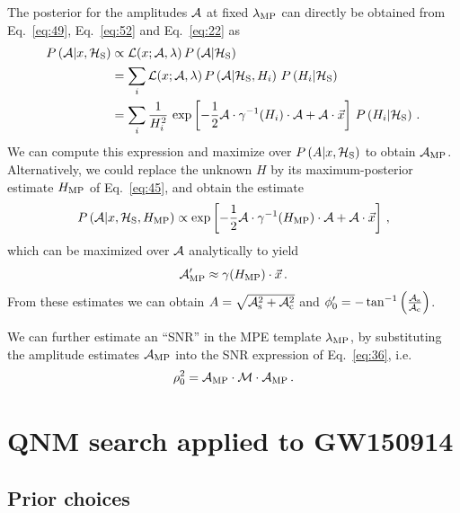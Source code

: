 \documentclass[aps,prd,onecolumn,notitlepage,nofootinbib,superscriptaddress,altaffilletter,floatfix]{revtex4-1}
\begin{document}
The posterior for the amplitudes ${\mathcal A}$ at fixed $\lambda_{\mathrm{MP}}$ can directly be obtained from Eq.~\eqref{eq:49}, Eq.~\eqref{eq:52} and Eq.~\eqref{eq:22} as
\begin{align}
  \label{eq:51}
  P\left({\mathcal A}\middle|x,\mathcal{H}_{\mathrm{S}}\right) &\propto \mathcal{L}(x;{\mathcal A},\lambda)\,P\left({\mathcal A}\middle|\mathcal{H}_{\mathrm{S}}\right) \\
  &= \sum_i \mathcal{L}(x;{\mathcal A},\lambda)\,P\left({\mathcal A}\middle|\mathcal{H}_{\mathrm{S}},H_i\right)\,P\left(H_i\middle|\mathcal{H}_{\mathrm{S}}\right)\,\\
  &= \sum_i \frac{1}{H_i^2}\,\exp\left[ -\frac{1}{2}{\mathcal A}\cdot\gamma^{-1}(H_i)\cdot{\mathcal A} + {\mathcal A}\cdot\vec{x} \right]\,P\left(H_i\middle|\mathcal{H}_{\mathrm{S}}\right)\,.
\end{align}
We can compute this expression and maximize over $P\left(A\middle|x,\mathcal{H}_{\mathrm{S}}\right)$ to obtain ${\mathcal A}_{\mathrm{MP}}$.
Alternatively, we could replace the unknown $H$ by its maximum-posterior estimate $H_{\mathrm{MP}}$ of Eq.~\eqref{eq:45}, and obtain the estimate
\begin{equation}
  \label{eq:53}
  P\left({\mathcal A}\middle|x,\mathcal{H}_{\mathrm{S}},H_{\mathrm{MP}}\right) \propto \exp\left[ -\frac{1}{2}{\mathcal A}\cdot\gamma^{-1}(H_{\mathrm{MP}})\cdot{\mathcal A} + {\mathcal A}\cdot\vec{x} \right]\,,
\end{equation}
which can be maximized over ${\mathcal A}$ analytically to yield
\begin{equation}
  \label{eq:31}
  {\mathcal A}_{\mathrm{MP}}' \approx \gamma(H_{\mathrm{MP}})\cdot\vec{x}\,.
\end{equation}
From these estimates we can obtain $A = \sqrt{{\mathcal A}_{\mathrm{s}}^2+{\mathcal A}_{\mathrm{c}}^2}$ and $\phi_0' = - \tan^{-1}\left(\frac{{\mathcal A}_{\mathrm{s}}}{{\mathcal A}_{\mathrm{c}}}\right)$.

We can further estimate an ``SNR'' in the MPE template $\lambda_{\mathrm{MP}}$, by substituting the amplitude estimates ${\mathcal A}_{\mathrm{MP}}$ into the SNR expression of
Eq.~\eqref{eq:36}, i.e.\
\begin{equation}
  \label{eq:20}
  \rho_0^2 = {\mathcal A}_{\mathrm{MP}}\cdot\mathcal{M}\cdot{\mathcal A}_{\mathrm{MP}}\,.
\end{equation}

\section{QNM search applied to GW150914}
\label{sec:qnm-search-applied}

\subsection{Prior choices}
\label{sec:prior-choices}
\end{document}
